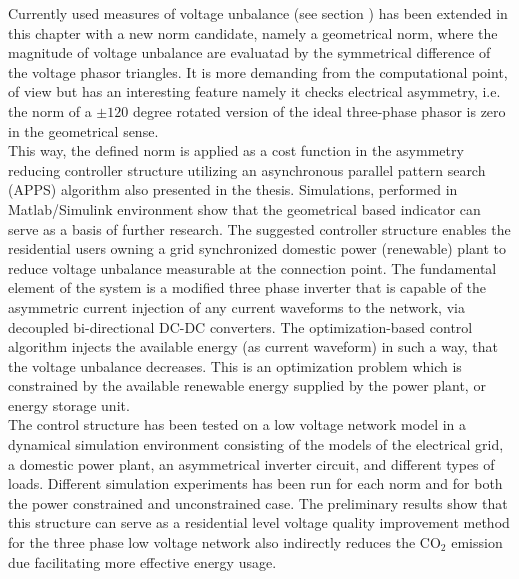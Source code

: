     Currently used measures of voltage unbalance (see section ) has been extended in this chapter with a new norm candidate, namely a geometrical norm, where the magnitude of voltage unbalance are evaluatad by the symmetrical difference of the voltage phasor triangles. It is more demanding from the computational point, of view but has an interesting feature namely it checks electrical asymmetry, i.e. the norm of a $\pm120$ degree  rotated version of the ideal three-phase phasor is zero in the geometrical sense.\\
    This way, the defined norm is applied as a cost function in the asymmetry reducing controller structure utilizing an asynchronous parallel pattern search (APPS) algorithm also presented in the thesis. Simulations, performed in Matlab/Simulink environment show that the geometrical based indicator can serve as a basis of further research. The suggested controller structure enables the residential users owning a grid synchronized domestic power (renewable) plant to reduce voltage unbalance measurable at the connection point. The fundamental element of the system is a modified three phase inverter that is capable of the asymmetric current injection of any current waveforms to the network, via decoupled bi-directional DC-DC converters. The optimization-based control algorithm injects the available energy (as current waveform) in such a way, that the voltage unbalance decreases. This is an optimization problem which is constrained by the available renewable energy supplied by the power plant, or energy storage unit.\\
    The control structure has been tested on a low voltage network model in a dynamical simulation environment consisting of the models of the electrical grid, a domestic power plant, an asymmetrical inverter circuit, and different types of loads. Different simulation experiments has been run for each norm and for both the power constrained and unconstrained case. The preliminary results show that this structure can serve as a residential level voltage quality improvement method for the three phase low voltage network also indirectly reduces the CO${}_2$ emission due facilitating more effective energy usage.

